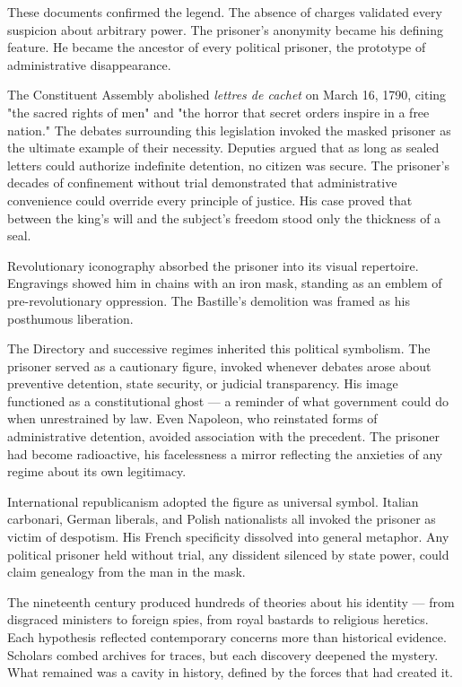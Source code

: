 These documents confirmed the legend. The absence of charges validated every suspicion about arbitrary power. The prisoner's anonymity became his defining feature. He became the ancestor of every political prisoner, the prototype of administrative disappearance.

The Constituent Assembly abolished \textit{lettres de cachet} on March 16, 1790, citing "the sacred rights of men" and "the horror that secret orders inspire in a free nation." The debates surrounding this legislation invoked the masked prisoner as the ultimate example of their necessity. Deputies argued that as long as sealed letters could authorize indefinite detention, no citizen was secure. The prisoner's decades of confinement without trial demonstrated that administrative convenience could override every principle of justice. His case proved that between the king's will and the subject's freedom stood only the thickness of a seal.

Revolutionary iconography absorbed the prisoner into its visual repertoire. Engravings showed him in chains with an iron mask, standing as an emblem of pre-revolutionary oppression. The Bastille's demolition was framed as his posthumous liberation.

The Directory and successive regimes inherited this political symbolism. The prisoner served as a cautionary figure, invoked whenever debates arose about preventive detention, state security, or judicial transparency. His image functioned as a constitutional ghost — a reminder of what government could do when unrestrained by law. Even Napoleon, who reinstated forms of administrative detention, avoided association with the precedent. The prisoner had become radioactive, his facelessness a mirror reflecting the anxieties of any regime about its own legitimacy.

International republicanism adopted the figure as universal symbol. Italian carbonari, German liberals, and Polish nationalists all invoked the prisoner as victim of despotism. His French specificity dissolved into general metaphor. Any political prisoner held without trial, any dissident silenced by state power, could claim genealogy from the man in the mask.

The nineteenth century produced hundreds of theories about his identity — from disgraced ministers to foreign spies, from royal bastards to religious heretics. Each hypothesis reflected contemporary concerns more than historical evidence. Scholars combed archives for traces, but each discovery deepened the mystery. What remained was a cavity in history, defined by the forces that had created it.

